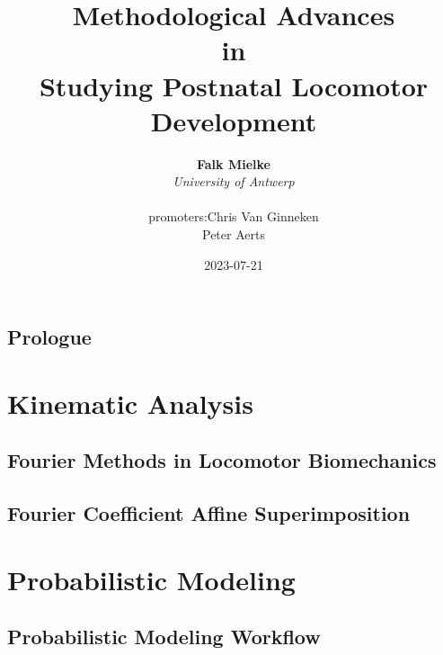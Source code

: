 \documentclass[12pt,a4paper,twoside]{report}
\title{Methodological Advances \\in \\Studying Postnatal Locomotor Development}
\author{\textbf{Falk Mielke}
\bigskip\\
\textit{University of Antwerp}
\bigskip\\
\begin{tabular}{r l}
  promoters: & Chris Van Ginneken
               \\ & Peter Aerts
\end{tabular}
}
\date{2023-07-21}
\begin{document}
\maketitle
\setcounter{tocdepth}{1}
\tableofcontents

\clearpage


\chapter{Prologue}\label{cpt:generalintro}




\part{Kinematic Analysis}
% 

\chapter{Fourier Methods in Locomotor Biomechanics}\label{cpt:fourier_review}


\chapter{Fourier Coefficient Affine Superimposition}\label{cpt:fcas}




\part{Probabilistic Modeling}
% 

\chapter{Probabilistic Modeling Workflow}\label{cpt:statistics}

\end{document}
